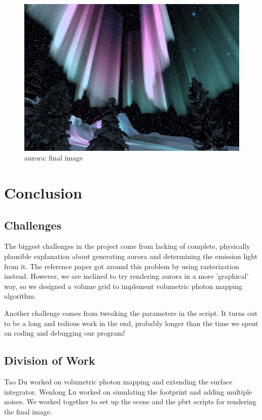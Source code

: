 \documentclass[10pt,a4paper]{article}
\begin{document}
\begin{figure}[h]
\centering
\includegraphics[width=0.7\linewidth]{./aurora}
\caption{aurora: final image}
\label{fig:aurora}
\end{figure}

\section{Conclusion}

\subsection{Challenges}

The biggest challenges in the project come from lacking of complete, physically plausible explanation about generating aurora and determining the emission light from it. The reference paper got around this problem by using rasterization instead. However, we are inclined to try rendering aurora in a more 'graphical' way, so we designed a volume grid to implement volumetric photon mapping algorithm.

Another challenge comes from tweaking the parameters in the script. It turns out to be a long and tedious work in the end, probably longer than the time we spent on coding and debugging our program!

\subsection{Division of Work}

Tao Du worked on volumetric photon mapping and extending the surface integrator. Wenlong Lu worked on simulating the footprint and adding multiple noises. We worked together to set up the scene and the pbrt scripts for rendering the final image.  



\end{document}
